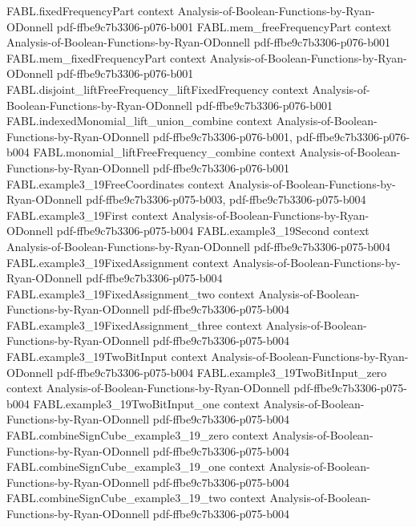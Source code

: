 \begin{theorem}
\proofstep
  {FABL.fixedFrequencyPart}
  {context}
  {Analysis-of-Boolean-Functions-by-Ryan-ODonnell}
  {pdf-ffbe9c7b3306-p076-b001}
\proofstep
  {FABL.mem_freeFrequencyPart}
  {context}
  {Analysis-of-Boolean-Functions-by-Ryan-ODonnell}
  {pdf-ffbe9c7b3306-p076-b001}
\proofstep
  {FABL.mem_fixedFrequencyPart}
  {context}
  {Analysis-of-Boolean-Functions-by-Ryan-ODonnell}
  {pdf-ffbe9c7b3306-p076-b001}
\proofstep
  {FABL.disjoint_liftFreeFrequency_liftFixedFrequency}
  {context}
  {Analysis-of-Boolean-Functions-by-Ryan-ODonnell}
  {pdf-ffbe9c7b3306-p076-b001}
\proofstep
  {FABL.indexedMonomial_lift_union_combine}
  {context}
  {Analysis-of-Boolean-Functions-by-Ryan-ODonnell}
  {pdf-ffbe9c7b3306-p076-b001,
    pdf-ffbe9c7b3306-p076-b004}
\proofstep
  {FABL.monomial_liftFreeFrequency_combine}
  {context}
  {Analysis-of-Boolean-Functions-by-Ryan-ODonnell}
  {pdf-ffbe9c7b3306-p076-b001}
\proofstep
  {FABL.example3_19FreeCoordinates}
  {context}
  {Analysis-of-Boolean-Functions-by-Ryan-ODonnell}
  {pdf-ffbe9c7b3306-p075-b003,
    pdf-ffbe9c7b3306-p075-b004}
\proofstep
  {FABL.example3_19First}
  {context}
  {Analysis-of-Boolean-Functions-by-Ryan-ODonnell}
  {pdf-ffbe9c7b3306-p075-b004}
\proofstep
  {FABL.example3_19Second}
  {context}
  {Analysis-of-Boolean-Functions-by-Ryan-ODonnell}
  {pdf-ffbe9c7b3306-p075-b004}
\proofstep
  {FABL.example3_19FixedAssignment}
  {context}
  {Analysis-of-Boolean-Functions-by-Ryan-ODonnell}
  {pdf-ffbe9c7b3306-p075-b004}
\proofstep
  {FABL.example3_19FixedAssignment_two}
  {context}
  {Analysis-of-Boolean-Functions-by-Ryan-ODonnell}
  {pdf-ffbe9c7b3306-p075-b004}
\proofstep
  {FABL.example3_19FixedAssignment_three}
  {context}
  {Analysis-of-Boolean-Functions-by-Ryan-ODonnell}
  {pdf-ffbe9c7b3306-p075-b004}
\proofstep
  {FABL.example3_19TwoBitInput}
  {context}
  {Analysis-of-Boolean-Functions-by-Ryan-ODonnell}
  {pdf-ffbe9c7b3306-p075-b004}
\proofstep
  {FABL.example3_19TwoBitInput_zero}
  {context}
  {Analysis-of-Boolean-Functions-by-Ryan-ODonnell}
  {pdf-ffbe9c7b3306-p075-b004}
\proofstep
  {FABL.example3_19TwoBitInput_one}
  {context}
  {Analysis-of-Boolean-Functions-by-Ryan-ODonnell}
  {pdf-ffbe9c7b3306-p075-b004}
\proofstep
  {FABL.combineSignCube_example3_19_zero}
  {context}
  {Analysis-of-Boolean-Functions-by-Ryan-ODonnell}
  {pdf-ffbe9c7b3306-p075-b004}
\proofstep
  {FABL.combineSignCube_example3_19_one}
  {context}
  {Analysis-of-Boolean-Functions-by-Ryan-ODonnell}
  {pdf-ffbe9c7b3306-p075-b004}
\proofstep
  {FABL.combineSignCube_example3_19_two}
  {context}
  {Analysis-of-Boolean-Functions-by-Ryan-ODonnell}
  {pdf-ffbe9c7b3306-p075-b004}

\end{theorem}
